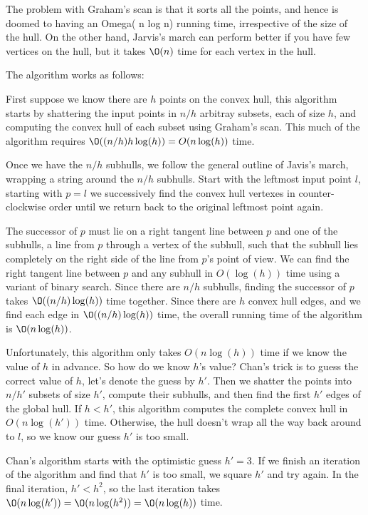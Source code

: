 \documentclass[10pt]{article}
\begin{document}
The problem with Graham's scan is that it sorts all the points, and hence is doomed to having an Omega( n log n) running time, irrespective of the size of the hull. On the other hand, Jarvis's march can perform better if you have few vertices on the hull, but it takes $\O(n)$ time for each vertex in the hull.

The algorithm works as follows: 

First suppose we know there are $h$ points on the convex hull, this algorithm starts by shattering the input points in $n/h$ arbitray subsets, each of size $h$, and computing the convex hull of each subset using Graham's scan. This much of the algorithm requires $\O((n/h)h\log(h)) = O(n\log(h))$ time.

Once we have the $n/h$ subhulls, we follow the general outline of Javis's march, wrapping a string around the $n/h$ subhulls. Start with the leftmost input point $l$, starting with $p = l$ we successively find the convex hull vertexes in counter-clockwise order until we return back to the original leftmost point again.

The successor of $p$ must lie on a right tangent line between $p$ and one of the subhulls, a line from $p$ through a vertex of the subhull, such that the subhull lies completely on the right side of the line from $p$'s point of view. We can find the right tangent line between $p$ and any subhull in $O(\log(h))$ time using a variant of binary search. Since there are $n/h$ subhulls, finding the successor of $p$ takes $\O((n/h)\log(h))$ time together. Since there are $h$ convex hull edges, and we find each edge in $\O((n/h)\log(h))$ time, the overall running time of the algorithm is $\O(n\log(h))$.

Unfortunately, this algorithm only takes $O(n\log(h))$ time if we know the value of $h$ in advance. So how do we know $h$'s value? Chan's trick is to guess the correct value of $h$, let's denote the guess by $h'$. Then we shatter the points into $n/h'$ subsets of size $h'$, compute their subhulls, and then find the first $h'$ edges of the global hull. If $h < h'$, this algorithm computes the complete convex hull in $O(n\log(h'))$ time. Otherwise, the hull doesn't wrap all the way back around to $l$, so we know our guess $h'$ is too small.

Chan's algorithm starts with the optimistic guess $h' = 3$. If we finish an iteration of the algorithm and find that $h'$ is too small, we square $h'$ and try again. In the final iteration, $h'<h^2$, so the last iteration takes $\O(n\log(h')) = \O(n\log(h^2)) = \O(n\log(h))$ time.
\end{document}
